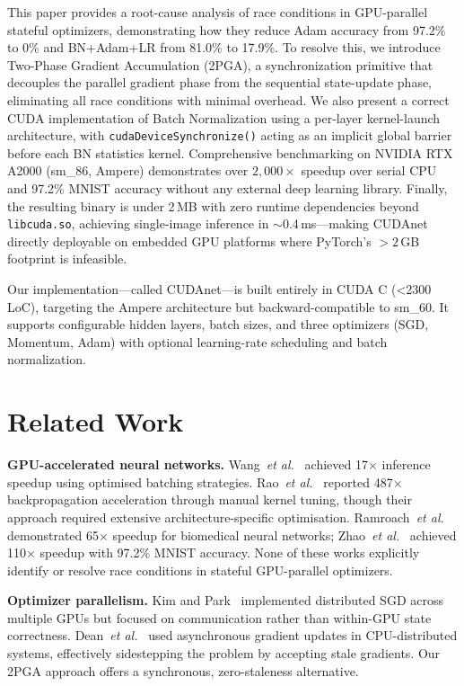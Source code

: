 \documentclass[conference]{IEEEtran}
\begin{document}
This paper provides a root-cause analysis of race conditions in GPU-parallel stateful optimizers, demonstrating how they reduce Adam accuracy from 97.2\% to 0\% and BN+Adam+LR from 81.0\% to 17.9\%. To resolve this, we introduce Two-Phase Gradient Accumulation (2PGA), a synchronization primitive that decouples the parallel gradient phase from the sequential state-update phase, eliminating all race conditions with minimal overhead. We also present a correct CUDA implementation of Batch Normalization using a per-layer kernel-launch architecture, with \texttt{cudaDeviceSynchronize()} acting as an implicit global barrier before each BN statistics kernel. Comprehensive benchmarking on NVIDIA RTX A2000 (sm\_86, Ampere) demonstrates over $2{,}000\times$ speedup over serial CPU and 97.2\% MNIST accuracy without any external deep learning library. Finally, the resulting binary is under 2\,MB with zero runtime dependencies beyond \texttt{libcuda.so}, achieving single-image inference in $\sim$0.4\,ms—making CUDAnet directly deployable on embedded GPU platforms where PyTorch's $>2$\,GB footprint is infeasible.

Our implementation—called CUDAnet—is built entirely in CUDA C (\textless 2300\,LoC), targeting the Ampere architecture but backward-compatible to sm\_60. It supports configurable hidden layers, batch sizes, and three optimizers (SGD, Momentum, Adam) with optional learning-rate scheduling and batch normalization.

\section{Related Work}

\textbf{GPU-accelerated neural networks.} Wang~\textit{et al.}~\cite{b4} achieved 17$\times$ inference speedup using optimised batching strategies. Rao~\textit{et al.}~\cite{b5} reported 487$\times$ backpropagation acceleration through manual kernel tuning, though their approach required extensive architecture-specific optimisation. Ramroach~\textit{et al.}~\cite{b6} demonstrated 65$\times$ speedup for biomedical neural networks; Zhao~\textit{et al.}~\cite{b14} achieved 110$\times$ speedup with 97.2\% MNIST accuracy. None of these works explicitly identify or resolve race conditions in stateful GPU-parallel optimizers.

\textbf{Optimizer parallelism.} Kim and Park~\cite{b13} implemented distributed SGD across multiple GPUs but focused on communication rather than within-GPU state correctness. Dean~\textit{et al.}~\cite{b10} used asynchronous gradient updates in CPU-distributed systems, effectively sidestepping the problem by accepting stale gradients. Our 2PGA approach offers a synchronous, zero-staleness alternative.
\end{document}
